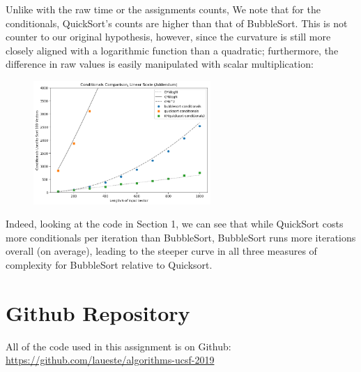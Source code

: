 \documentclass{article}
\begin{document}
Unlike with the raw time or the assignments counts, We note that for the conditionals, QuickSort's counts are higher than that of BubbleSort. This is not counter to our original hypothesis, however, since the curvature is still more closely aligned with a logarithmic function than a quadratic; furthermore, the difference in raw values is easily manipulated with scalar multiplication: \par
\begin{figure}[h!]
\centering
\includegraphics[width=0.6\textwidth]{hw1/fig5.png}
\end{figure}
Indeed, looking at the code in Section 1, we can see that while QuickSort costs more conditionals per iteration than BubbleSort, BubbleSort runs more iterations overall (on average), leading to the steeper curve in all three measures of complexity for BubbleSort relative to Quicksort. \par

\section{Github Repository}
All of the code used in this assignment is on Github: \url{https://github.com/laueste/algorithms-ucsf-2019}
\end{document}
